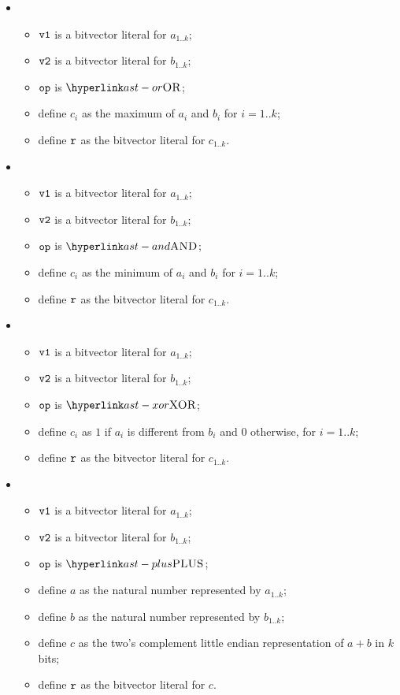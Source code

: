 \begin{itemize}
  \item {}
  \begin{itemize}
    \item $\texttt{v1}$ is a bitvector literal for $a_{1..k}$;
    \item $\texttt{v2}$ is a bitvector literal for $b_{1..k}$;
    \item $\texttt{op}$ is $\OR$;
    \item define $c_i$ as the maximum of $a_i$ and $b_i$ for $i=1..k$;
    \item define $\texttt{r}$ as the bitvector literal for $c_{1..k}$.
  \end{itemize}

  \item {}
  \begin{itemize}
    \item $\texttt{v1}$ is a bitvector literal for $a_{1..k}$;
    \item $\texttt{v2}$ is a bitvector literal for $b_{1..k}$;
    \item $\texttt{op}$ is $\AND$;
    \item define $c_i$ as the minimum of $a_i$ and $b_i$ for $i=1..k$;
    \item define $\texttt{r}$ as the bitvector literal for $c_{1..k}$.
  \end{itemize}

  \item {}
  \begin{itemize}
    \item $\texttt{v1}$ is a bitvector literal for $a_{1..k}$;
    \item $\texttt{v2}$ is a bitvector literal for $b_{1..k}$;
    \item $\texttt{op}$ is $\XOR$;
    \item define $c_i$ as $1$ if $a_i$ is different from $b_i$ and $0$ otherwise, for $i=1..k$;
    \item define $\texttt{r}$ as the bitvector literal for $c_{1..k}$.
  \end{itemize}

  \item {}
  \begin{itemize}
    \item $\texttt{v1}$ is a bitvector literal for $a_{1..k}$;
    \item $\texttt{v2}$ is a bitvector literal for $b_{1..k}$;
    \item $\texttt{op}$ is $\PLUS$;
    \item define $a$ as the natural number represented by $a_{1..k}$;
    \item define $b$ as the natural number represented by $b_{1..k}$;
    \item define $c$ as the two's complement little endian representation of $a+b$ in $k$ bits;
    \item define $\texttt{r}$ as the bitvector literal for $c$.
  \end{itemize}


\end{itemize}
